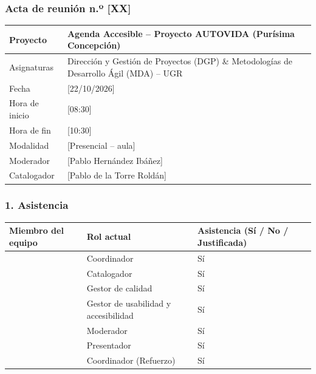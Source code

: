 \subsubsection*{Acta de reunión n.º [XX]}

\begin{center}
\small
\begin{tabularx}{\textwidth}{|p{3.4cm}|X|}
\hline
\rowcolor{tableHeader}
Proyecto & Agenda Accesible -- Proyecto AUTOVIDA (Purísima Concepción) \\
\hline
Asignaturas & Dirección y Gestión de Proyectos (DGP) \& Metodologías de Desarrollo Ágil (MDA) -- UGR \\
\hline
Fecha & [22/10/2026] \\
\hline
Hora de inicio & [08:30] \\
\hline
Hora de fin & [10:30] \\
\hline
Modalidad & [Presencial -- aula] \\
\hline
Moderador & [Pablo Hernández Ibáñez] \\
\hline
Catalogador & [Pablo de la Torre Roldán] \\
\hline
\end{tabularx}
\end{center}

\subsubsection*{1. Asistencia}
\begin{center}
\small
\begin{tabularx}{\textwidth}{|X|X|p{3.5cm}|}
\hline
\rowcolor{tableHeader}
Miembro del equipo & Rol actual & Asistencia (Sí / No / Justificada) \\
\hline
[Miguel Ángel Luque Gómez] & Coordinador & Sí \\
\hline
[Pablo de la Torre Roldán] & Catalogador & Sí \\
\hline
[Yeray Rodríguez Navas] & Gestor de calidad & Sí \\
\hline
[Julián Carrión Tovar] & Gestor de usabilidad y accesibilidad & Sí \\
\hline
[Pablo Hernández Ibáñez] & Moderador & Sí \\
\hline
[José Rodríguez Fernández] & Presentador & Sí \\
\hline
[Amine Azzammouri] & Coordinador (Refuerzo) & Sí \\
\hline
\end{tabularx}
\end{center}

